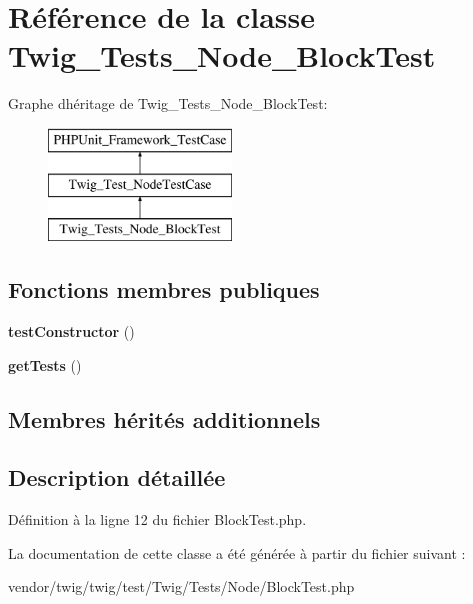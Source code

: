 \hypertarget{class_twig___tests___node___block_test}{}\section{Référence de la classe Twig\+\_\+\+Tests\+\_\+\+Node\+\_\+\+Block\+Test}
\label{class_twig___tests___node___block_test}
Graphe d\textquotesingle{}héritage de Twig\+\_\+\+Tests\+\_\+\+Node\+\_\+\+Block\+Test\+:\begin{figure}[H]
\begin{center}
\leavevmode
\includegraphics[height=3.000000cm]{class_twig___tests___node___block_test}
\end{center}
\end{figure}
\subsection*{Fonctions membres publiques}
\begin{DoxyCompactItemize}
\item 
{\bfseries test\+Constructor} ()\hypertarget{class_twig___tests___node___block_test_a47094dc941e72950570900d1418f89c6}{}\label{class_twig___tests___node___block_test_a47094dc941e72950570900d1418f89c6}

\item 
{\bfseries get\+Tests} ()\hypertarget{class_twig___tests___node___block_test_a7e247dd31cc8d37a6c97353a062a0080}{}\label{class_twig___tests___node___block_test_a7e247dd31cc8d37a6c97353a062a0080}

\end{DoxyCompactItemize}
\subsection*{Membres hérités additionnels}


\subsection{Description détaillée}


Définition à la ligne 12 du fichier Block\+Test.\+php.



La documentation de cette classe a été générée à partir du fichier suivant \+:\begin{DoxyCompactItemize}
\item 
vendor/twig/twig/test/\+Twig/\+Tests/\+Node/Block\+Test.\+php\end{DoxyCompactItemize}

